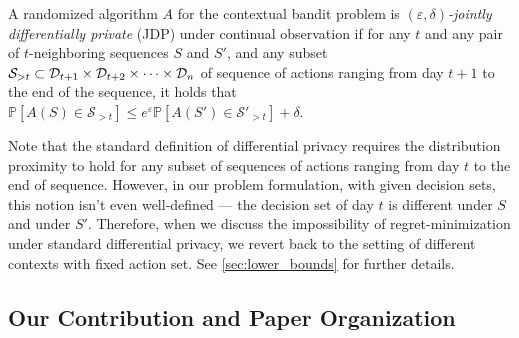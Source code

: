 \documentclass{article}
\renewcommand{\Pr}{\mathds{P}}
\begin{document}
\begin{definition}
\label{def:joint-dp}
  A randomized algorithm $A$ for the contextual bandit problem is
  \emph{$(\varepsilon,\delta)$-jointly differentially private} (JDP) under continual observation if for any $t$ and any pair of $t$-neighboring sequences $S$ and $S'$, and any subset ${\cal S}_{>t} \subset \mathcal{D}_{t+1} \times \mathcal{D}_{t+2} \times \cdots \times \mathcal{D}_{n}$ of sequence of actions ranging from day $t+1$ to the end of the sequence, it holds that $\Pr[A(S)\in \mathcal{S}_{>t}] \leq e^\varepsilon\Pr[A(S')\in \mathcal{S}'_{>t}] +\delta$.
\end{definition}
Note that the standard definition of differential privacy requires the
distribution proximity to hold for any subset of sequences of actions
ranging from day $t$ to the end of sequence. However, in our problem
formulation, with given decision sets, this notion isn't even
well-defined --- the decision set of day $t$ is different under $S$
and under $S'$. Therefore, when we discuss the impossibility of
regret-minimization under standard differential privacy, we revert
back to the setting of different contexts with fixed action set. See
\cref{sec:lower_bounds} for further details.

\subsection{Our Contribution and Paper Organization}
\label{subsec:contributions}
\end{document}
